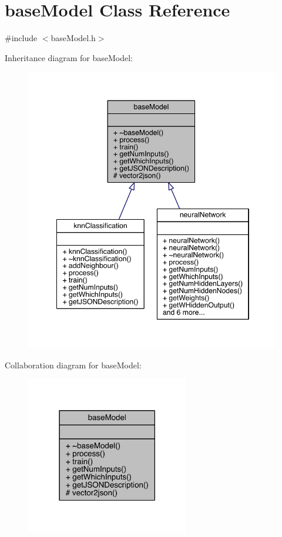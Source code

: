 \hypertarget{classbase_model}{}\section{base\+Model Class Reference}
\label{classbase_model}


{\ttfamily \#include $<$base\+Model.\+h$>$}



Inheritance diagram for base\+Model\+:\nopagebreak
\begin{figure}[H]
\begin{center}
\leavevmode
\includegraphics[width=348pt]{classbase_model__inherit__graph}
\end{center}
\end{figure}


Collaboration diagram for base\+Model\+:\nopagebreak
\begin{figure}[H]
\begin{center}
\leavevmode
\includegraphics[width=202pt]{classbase_model__coll__graph}
\end{center}
\end{figure}

